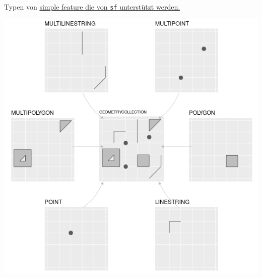 \documentclass[ignorenonframetext,]{beamer}
\begin{document}
\begin{frame}{Typen von
\href{https://geocompr.robinlovelace.net/spatial-class.html}{simple
feature die von \texttt{sf} unterstützt werden.}}

\includegraphics{figure/sf-classes.png}

\end{frame}
\end{document}
